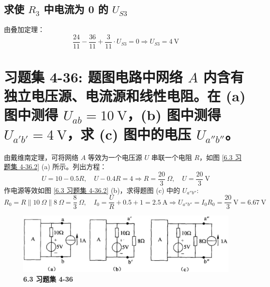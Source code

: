 \documentclass[UTF8]{report}
\theoremstyle{MyLineTheoremStyle} %
\theoremstyle{MyBlockTheoremStyle} %
\theoremstyle{MySubsubsectionStyle} %
\begin{document}
\subsection{求使 $R_3$ 中电流为 0 的 $U_{S3}$}

由叠加定理：
\begin{equation}
\boxed{
    \frac{24}{11} - \frac{36}{11} + \frac{3}{11} \cdot U_{S3} = 0 \Longrightarrow U_{S3} = 4 \ \mathrm{V}
}
\end{equation}

\section{习题集 4-36: 题图电路中网络 $A$ 内含有独立电压源、电流源和线性电阻。在 (a) 图中测得 $U_{ab} = 10 \ \mathrm{V}$，(b) 图中测得 $U_{a'b'} = 4 \ \mathrm{V}$，求 (c) 图中的电压 $U_{a''b''}$。}

由戴维南定理，可将网络 $A$ 等效为一个电压源 $U$ 串联一个电阻 $R$，如图 \ref{6.3 习题集 4-36.2} (a) 所示。列出方程：
\begin{equation}
U = 10 - 0.5 R,\quad U - 0.4 R = 4 \Longrightarrow R = \frac{20}{3} \ \Omega,\quad U = \frac{20}{3} \ \mathrm{V}
\end{equation}
作电源等效如图 \ref{6.3 习题集 4-36.2} (b)，求得题图 (c) 中的 $U_{a''b''}$:
\begin{equation}
R_0 = R \parallel 10 \ \Omega \parallel 8 \ \Omega = \frac{8}{3} \ \Omega,\quad I_0 = \frac{U}{R} + 0.5 + 1 = 2.5 \ \mathrm{A} \Longrightarrow 
\boxed{
    U_{a''b''} =  I_0R_0 = \frac{20}{3} \ \mathrm{V} = 6.67 \ \mathrm{V}
}
\end{equation}

\begin{figure}[H]\centering
\includegraphics[width=0.85\columnwidth]{assets/6/image (7).jpg}
\caption{\bfseries 6.3 习题集 4-36}\label{6.3 习题集 4-36}
\end{figure}
\end{document}

